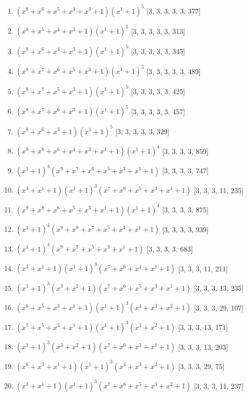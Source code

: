 \documentclass[10pt,twocolumn]{article}
\begin{document}
\begin{enumerate}
\item $(x^{8} + x^{6} + x^{5} + x^{4} + x^{3} + 1)(x^{1} + 1)^{5}$  [3, 3, 3, 3, 3, 377]
\item $(x^{8} + x^{5} + x^{4} + x^{3} + 1)(x^{1} + 1)^{5}$  [3, 3, 3, 3, 3, 313]
\item $(x^{8} + x^{6} + x^{4} + x^{3} + 1)(x^{1} + 1)^{5}$  [3, 3, 3, 3, 3, 345]
\item $(x^{8} + x^{7} + x^{6} + x^{5} + x^{3} + 1)(x^{1} + 1)^{5}$  [3, 3, 3, 3, 3, 489]
\item $(x^{8} + x^{7} + x^{5} + x^{3} + 1)(x^{1} + 1)^{5}$  [3, 3, 3, 3, 3, 425]
\item $(x^{8} + x^{7} + x^{6} + x^{3} + 1)(x^{1} + 1)^{5}$  [3, 3, 3, 3, 3, 457]
\item $(x^{8} + x^{6} + x^{3} + 1)(x^{1} + 1)^{5}$  [3, 3, 3, 3, 3, 329]
\item $(x^{9} + x^{8} + x^{6} + x^{4} + x^{3} + x^{1} + 1)(x^{1} + 1)^{4}$  [3, 3, 3, 3, 859]
\item $(x^{1} + 1)^{4}(x^{9} + x^{7} + x^{6} + x^{5} + x^{3} + x^{1} + 1)$  [3, 3, 3, 3, 747]
\item $(x^{3} + x^{1} + 1)(x^{1} + 1)^{3}(x^{7} + x^{6} + x^{5} + x^{3} + x^{1} + 1)$  [3, 3, 3, 11, 235]
\item $(x^{9} + x^{8} + x^{6} + x^{5} + x^{3} + x^{1} + 1)(x^{1} + 1)^{4}$  [3, 3, 3, 3, 875]
\item $(x^{1} + 1)^{4}(x^{9} + x^{8} + x^{7} + x^{5} + x^{3} + x^{1} + 1)$  [3, 3, 3, 3, 939]
\item $(x^{1} + 1)^{4}(x^{9} + x^{7} + x^{5} + x^{3} + x^{1} + 1)$  [3, 3, 3, 3, 683]
\item $(x^{3} + x^{1} + 1)(x^{1} + 1)^{3}(x^{7} + x^{6} + x^{4} + x^{1} + 1)$  [3, 3, 3, 11, 211]
\item $(x^{1} + 1)^{3}(x^{3} + x^{2} + 1)(x^{7} + x^{6} + x^{5} + x^{3} + x^{1} + 1)$  [3, 3, 3, 13, 235]
\item $(x^{6} + x^{5} + x^{3} + x^{1} + 1)(x^{1} + 1)^{3}(x^{4} + x^{3} + x^{2} + 1)$  [3, 3, 3, 29, 107]
\item $(x^{7} + x^{5} + x^{3} + x^{1} + 1)(x^{1} + 1)^{3}(x^{3} + x^{2} + 1)$  [3, 3, 3, 13, 171]
\item $(x^{1} + 1)^{3}(x^{3} + x^{2} + 1)(x^{7} + x^{6} + x^{3} + x^{1} + 1)$  [3, 3, 3, 13, 203]
\item $(x^{6} + x^{3} + x^{1} + 1)(x^{1} + 1)^{3}(x^{4} + x^{3} + x^{2} + 1)$  [3, 3, 3, 29, 75]
\item $(x^{3} + x^{1} + 1)(x^{1} + 1)^{3}(x^{7} + x^{6} + x^{5} + x^{3} + x^{2} + 1)$  [3, 3, 3, 11, 237]

\end{enumerate}
\end{document}
